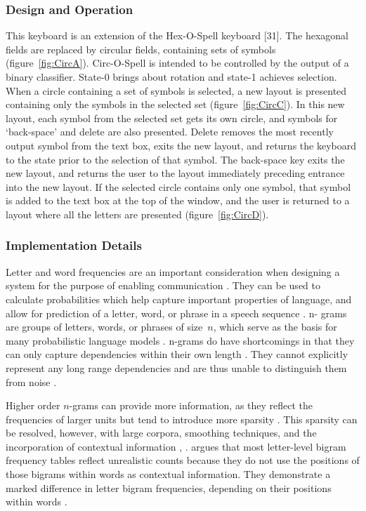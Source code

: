 \documentclass[12pt,titlepage]{article}
\begin{document}
\subsubsection{Design and Operation}

This keyboard is an extension of the Hex-O-Spell keyboard [31].  The hexagonal fields are replaced by 
circular fields, containing sets of symbols (figure~\ref{fig:CircA}).  Circ-O-Spell is intended to be controlled by the 
output of a binary classifier.  State-0 brings about rotation and state-1 achieves selection.  When a circle 
containing a set of symbols is selected, a new layout is presented containing only the symbols in the 
selected set (figure~\ref{fig:CircC}).  In this new layout, each symbol from the selected set gets its own circle, and 
symbols for `back-space' and delete are also presented.  Delete removes the most recently output 
symbol from the text box, exits the new layout, and returns the keyboard to the state prior to the 
selection of that symbol.  The back-space key exits the new layout, and returns the user to the layout 
immediately preceding entrance into the new layout.  If the selected circle contains only one symbol, 
that symbol is added to the text box at the top of the window, and the user is returned to a layout where 
all the letters are presented (figure~\ref{fig:CircD}).

\subsubsection*{Implementation Details}

Letter and word frequencies are an important consideration when designing a system for the purpose of 
enabling communication \cite{jones_case-sensitive_2004}.  They can be used to calculate probabilities which help capture important 
properties of language, and allow for prediction of a letter, word, or phrase in a speech sequence \cite{jones_case-sensitive_2004}.  n- 
grams are groups of letters, words, or phrases of size~$n$, which serve as the basis for many probabilistic 
language models \cite{reviewer-lee_review_2000}.  n-grams do have shortcomings in that they can only capture dependencies within 
their own length \cite{reviewer-lee_review_2000}.  They cannot explicitly represent any long range dependencies and are thus unable 
to distinguish them from noise \cite{reviewer-lee_review_2000}.

Higher order $n$-grams can provide more information, as they reflect the frequencies of larger units \cite{jones_case-sensitive_2004} 
but tend to introduce more sparsity \cite{_url.ppt_????}.  This sparsity can be resolved, however, with large corpora, 
smoothing techniques, and the incorporation of contextual information \cite{curran_very_2002}, \cite{russell_artificial_2002}.  \cite{rawlinson_bigram_1976} argues that most letter-level
bigram frequency tables reflect unrealistic counts because they do not use the positions of  those 
bigrams within words as contextual information.  They demonstrate a marked difference in letter 
bigram frequencies, depending on their positions within words \cite{rawlinson_bigram_1976}.
\end{document}
